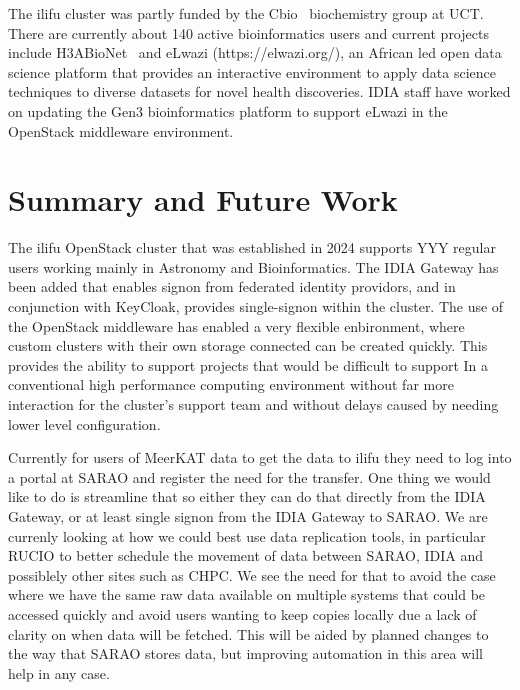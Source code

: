 \documentclass[12pt,twocolumn,a4paper]{article}
\begin{document}

The ilifu cluster was partly funded by the Cbio~\cite{CBio} biochemistry group at UCT.
There are currently about 140 active bioinformatics users and 
current projects include H3ABioNet~\cite{bigCBioProject} and eLwazi (https://elwazi.org/),
an African led open data science platform that provides an interactive environment to apply data science techniques to 
diverse datasets for novel health discoveries.
IDIA staff have worked on updating the Gen3 bioinformatics platform to support eLwazi in the OpenStack
middleware environment.


\section{Summary and Future Work}
\label{sec:conclusions}


The ilifu OpenStack cluster that was established in 2024 supports YYY regular users working mainly in Astronomy
and Bioinformatics. The IDIA Gateway has been added that enables signon from federated identity providors, and 
in conjunction with KeyCloak, provides single-signon within the cluster. The use of the OpenStack middleware
has enabled a very flexible enbironment, where custom clusters with their own storage connected can be
created quickly. This provides the ability to support projects that would be difficult to support In
a conventional high performance computing environment without far more interaction for the cluster's
support team and without delays caused by needing lower level configuration.

Currently for users of MeerKAT data to get the data to ilifu they need to log into a portal at SARAO
and register the need for the transfer. One thing we would like to do is streamline that so either
they can do that directly from the IDIA Gateway, or at least single signon from the IDIA Gateway
to SARAO. We are currenly looking at how we could best use data replication tools, in particular
RUCIO to better schedule the movement of data between SARAO, IDIA and possiblely other sites such 
as CHPC. We see the need for that to avoid the case where we have the same raw data available
on multiple systems that could be accessed quickly and avoid users wanting to keep copies locally
due a lack of clarity on when data will be fetched. This will be aided by planned changes to the
way that SARAO stores data, but improving automation in this area will help in any case.
\end{document}
